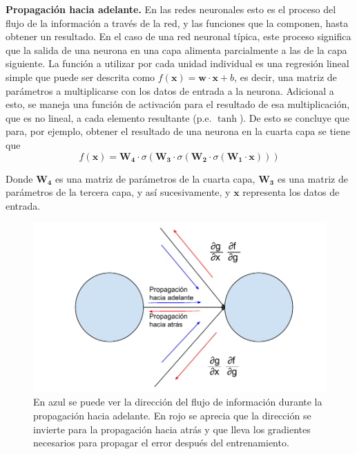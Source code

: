\textbf{Propagación hacia adelante.} En las redes neuronales esto es el proceso del flujo de la información a través de la red, y las funciones que la componen, hasta obtener un resultado. En el caso de una red neuronal típica, este proceso significa que la salida de una neurona en una capa alimenta parcialmente a las de la capa siguiente. La función a utilizar por cada unidad individual es una regresión lineal simple que puede ser descrita como $f(\mathbf{x}) = \mathbf{w} \cdot \mathbf{x} + b$, es decir, una matriz de parámetros a multiplicarse con los datos de entrada a la neurona. Adicional a esto, se maneja una función de activación para el resultado de esa multiplicación, que es no lineal, a cada elemento resultante (p.e. $\tanh$). De esto se concluye que para, por ejemplo, obtener el resultado de una neurona en la cuarta capa se tiene que
\begin{equation}
\label{eq:feedfwdeq}
f(\mathbf{x}) = \mathbf{W_4} \cdot \sigma(\mathbf{W_3} \cdot \sigma (\mathbf{W_2} \cdot \sigma(\mathbf{W_1} \cdot \mathbf{x})))
\end{equation}

Donde $\mathbf{W_4}$ es una matriz de parámetros de la cuarta capa, $\mathbf{W_3}$ es una matriz de parámetros de la tercera capa, y así sucesivamente, y $\mathbf{x}$ representa los datos de entrada.

\begin{figure}
\includegraphics[scale=0.8]{Figures/backprop.pdf}
\caption{En azul se puede ver la dirección del flujo de información durante la propagación hacia adelante. En rojo se aprecia que la dirección se invierte para la propagación hacia atrás y que lleva los gradientes necesarios para propagar el error después del entrenamiento.}
\label{fig:backprop}
\end{figure}


